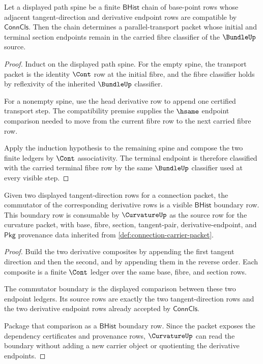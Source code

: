 \begin{theorem}
\label{thm:connection-parallel-transport-obligation}
Let a displayed path spine be a finite $\mathsf{BHist}$ chain of base-point rows whose adjacent tangent-direction and derivative endpoint rows are compatible by $\mathsf{ConnCls}$. Then the chain determines a parallel-transport packet whose initial and terminal section endpoints remain in the carried fibre classifier of the $\BundleUp$ source.
\end{theorem}
\begin{proof}
Induct on the displayed path spine. For the empty spine, the transport packet is the identity $\Cont$ row at the initial fibre, and the fibre classifier holds by reflexivity of the inherited $\BundleUp$ classifier.

For a nonempty spine, use the head derivative row to append one certified transport step. The compatibility premise supplies the $\hsame$ endpoint comparison needed to move from the current fibre row to the next carried fibre row.

Apply the induction hypothesis to the remaining spine and compose the two finite ledgers by $\Cont$ associativity. The terminal endpoint is therefore classified with the carried terminal fibre row by the same $\BundleUp$ classifier used at every visible step.
\end{proof}

\begin{theorem}
\label{thm:connection-curvature-boundary-obligation}
Given two displayed tangent-direction rows for a connection packet, the commutator of the corresponding derivative rows is a visible $\mathsf{BHist}$ boundary row. This boundary row is consumable by $\CurvatureUp$ as the source row for the curvature packet, with base, fibre, section, tangent-pair, derivative-endpoint, and $\mathsf{Pkg}$ provenance data inherited from \autoref{def:connection-carrier-packet}.
\end{theorem}
\begin{proof}
Build the two derivative composites by appending the first tangent direction and then the second, and by appending them in the reverse order. Each composite is a finite $\Cont$ ledger over the same base, fibre, and section rows.

The commutator boundary is the displayed comparison between these two endpoint ledgers. Its source rows are exactly the two tangent-direction rows and the two derivative endpoint rows already accepted by $\mathsf{ConnCls}$.

Package that comparison as a $\mathsf{BHist}$ boundary row. Since the packet exposes the dependency certificates and provenance rows, $\CurvatureUp$ can read the boundary without adding a new carrier object or quotienting the derivative endpoints.
\end{proof}

